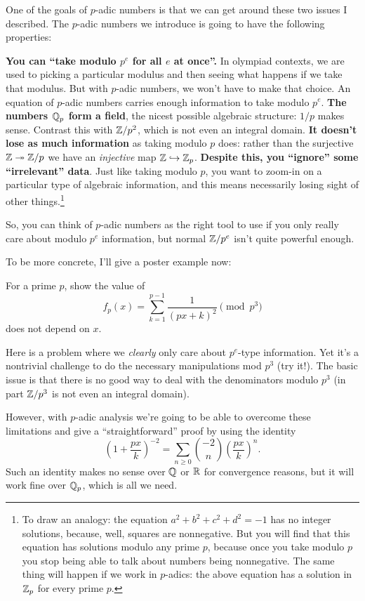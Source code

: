 One of the goals of $p$-adic numbers is that we can get around
these two issues I described.
The $p$-adic numbers we introduce is going to have the following properties:
\begin{enumerate}
	\ii \textbf{You can ``take modulo $p^e$ for all $e$ at once''.}
	In olympiad contexts, we are used to picking a particular modulus and then
	seeing what happens if we take that modulus.
	But with $p$-adic numbers, we won't have to make that choice.
	An equation of $p$-adic numbers carries enough information
	to take modulo $p^e$.
	\ii \textbf{The numbers $\mathbb Q_p$ form a field},
	the nicest possible algebraic structure:
	$1/p$ makes sense.
	Contrast this with $\mathbb Z/p^2$, which is not even an integral domain.
	\ii \textbf{It doesn't lose as much information}
	as taking modulo $p$ does:
	rather than the surjective $\mathbb Z \twoheadrightarrow \mathbb Z/p$ we have an
	\emph{injective} map $\mathbb Z \hookrightarrow \mathbb Z_p$.
	\ii \textbf{Despite this, you ``ignore'' some ``irrelevant'' data}.
	Just like taking modulo $p$, you want to zoom-in on
	a particular type of algebraic information,
	and this means necessarily
	losing sight of other things.\footnote{To draw an analogy: the equation
	$ a^2 + b^2 + c^2 + d^2 = -1$
	has no integer solutions, because, well, squares are nonnegative.
	But you will find that this equation has solutions modulo any prime $p$,
	because once you take modulo $p$ you stop being able to
	talk about numbers being nonnegative.
	The same thing will happen if we work in $p$-adics:
	the above equation has a solution in $\mathbb Z_p$ for every prime $p$.}
\end{enumerate}
So, you can think of $p$-adic numbers as the right tool to use
if you only really care about modulo $p^e$ information,
but normal $\mathbb Z/p^e$ isn't quite powerful enough.

To be more concrete, I'll give a poster example now:
\begin{example}
	For a prime $p$, show the value of
	\[ f_p(x) = \sum_{k=1}^{p-1} \frac{1}{(px+k)^2} \pmod{p^3} \]
	does not depend on $x$.
	\label{ex:token}
\end{example}
Here is a problem where we \emph{clearly} only care
about $p^e$-type information.
Yet it's a nontrivial challenge to do the
necessary manipulations mod $p^3$ (try it!).
The basic issue is that there is no good way to deal with
the denominators modulo $p^3$
(in part $\mathbb Z/p^3$ is not even an integral domain).

However, with $p$-adic analysis we're going to be able
to overcome these limitations and give a ``straightforward'' proof
by using the identity
\[
	\left( 1 + \frac{px}{k} \right)^{-2}
	= \sum_{n \ge 0} \binom{-2}{n} \left( \frac{px}{k} \right)^n.
\]
Such an identity makes no sense over $\mathbb Q$ or $\mathbb R$ for convergence reasons,
but it will work fine over $\mathbb Q_p$, which is all we need.

